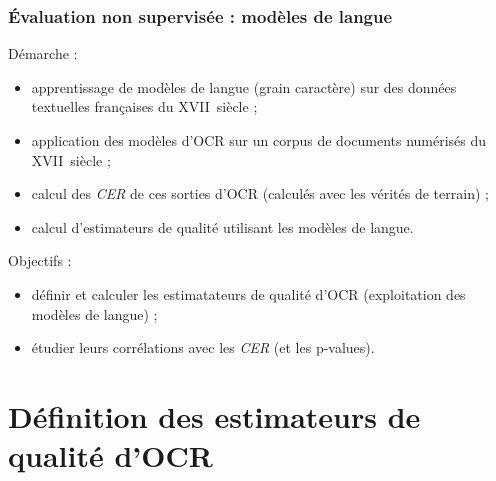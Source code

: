 \documentclass{beamer}
\begin{document}
		\begin{frame}\frametitle{\'{E}valuation non supervisée : modèles de langue}
			Démarche :
			\begin{itemize}
				\item apprentissage de modèles de langue (grain caractère) sur des données textuelles françaises du XVII\ieme~siècle ;
				\item application des modèles d'OCR sur un corpus de documents numérisés du XVII\ieme~siècle ;
				\item calcul des \textit{CER} de ces sorties d'OCR (calculés avec les vérités de terrain) ;
				\item calcul d'estimateurs de qualité utilisant les modèles de langue.
			\end{itemize}

			Objectifs : 
			\begin{itemize}
				\item définir et calculer les estimatateurs de qualité d'OCR (exploitation des modèles de langue) ;
				\item étudier leurs corrélations avec les \textit{CER} (et les p-values).
			\end{itemize}
		\end{frame}

	\section{Définition des estimateurs de qualité d'OCR}
\end{document}
